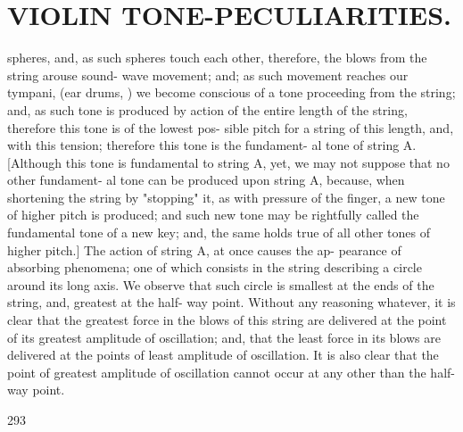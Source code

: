 \documentclass{article}
\begin{document}
\section*{VIOLIN TONE-PECULIARITIES.}
spheres, and, as such spheres touch each other, therefore, the blows from the string arouse sound- wave movement; and; as such movement reaches our tympani, (ear drums, ) we become conscious of a tone proceeding from the string; and, as such tone is produced by action of the entire length of the string, therefore this tone is of the lowest pos- sible pitch for a string of this length, and, with this tension; therefore this tone is the fundament- al tone of string A. [Although this tone is fundamental to string A, yet, we may not suppose that no other fundament- al tone can be produced upon string A, because, when shortening the string by "stopping" it, as with pressure of the finger, a new tone of higher pitch is produced; and such new tone may be rightfully called the fundamental tone of a new key; and, the same holds true of all other tones of higher pitch.] The action of string A, at once causes the ap- pearance of absorbing phenomena; one of which consists in the string describing a circle around its long axis. We observe that such circle is smallest at the ends of the string, and, greatest at the half- way point. Without any reasoning whatever, it is clear that the greatest force in the blows of this string are delivered at the point of its greatest amplitude of oscillation; and, that the least force in its blows are delivered at the points of least amplitude of oscillation. It is also clear that the point of greatest amplitude of oscillation cannot occur at any other than the half-way point.

293
\end{document}
